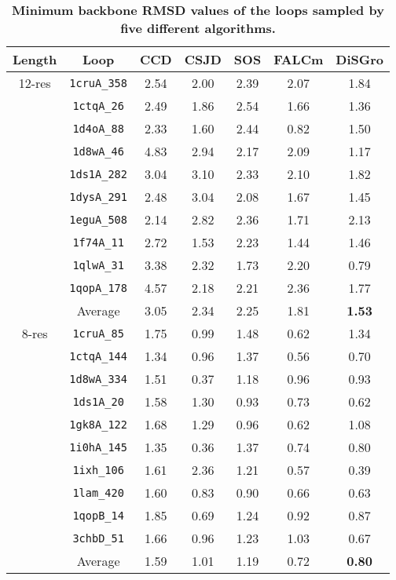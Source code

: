 \begin{table}[!h]
\caption{ \bf{Minimum backbone RMSD values of the loops sampled by
five different algorithms.}}
\begin{tabular}{|c|c||c|c|c|c||c|}
\hline
Length & Loop & CCD & CSJD & SOS & FALCm & {\sc DiSGro}\\
\hline
12-res & {\tt 1cruA\_358} & 2.54 & 2.00 & 2.39 & 2.07 & 1.84\\
     & {\tt 1ctqA\_26} & 2.49 & 1.86 & 2.54 & 1.66 & 1.36\\
     & {\tt 1d4oA\_88} & 2.33 & 1.60 & 2.44 & 0.82 & 1.50\\
     & {\tt 1d8wA\_46} & 4.83 & 2.94 & 2.17 & 2.09 & 1.17\\
     & {\tt 1ds1A\_282} & 3.04 & 3.10 & 2.33 & 2.10 & 1.82\\
     & {\tt 1dysA\_291} & 2.48 & 3.04 & 2.08 & 1.67 & 1.45\\
     & {\tt 1eguA\_508} & 2.14 & 2.82 & 2.36 & 1.71 & 2.13\\
     & {\tt 1f74A\_11} & 2.72 & 1.53 & 2.23 & 1.44 & 1.46\\
     & {\tt 1qlwA\_31} & 3.38 & 2.32 & 1.73 & 2.20 & 0.79\\
     & {\tt 1qopA\_178} & 4.57 & 2.18 & 2.21 & 2.36 & 1.77\\
     \hline
     & Average & 3.05 & 2.34 & 2.25 & 1.81 & \textbf{1.53}\\
     \hline
     \hline
    8-res & {\tt 1cruA\_85} & 1.75 & 0.99 & 1.48 & 0.62 & 1.34\\
     & {\tt 1ctqA\_144} & 1.34 & 0.96 & 1.37 & 0.56 & 0.70\\
     & {\tt 1d8wA\_334} & 1.51 & 0.37 & 1.18 & 0.96 & 0.93\\
     & {\tt 1ds1A\_20} & 1.58 & 1.30 & 0.93 & 0.73 & 0.62\\
     & {\tt 1gk8A\_122} & 1.68 & 1.29 & 0.96 & 0.62 & 1.08\\
     & {\tt 1i0hA\_145} & 1.35 & 0.36 & 1.37 & 0.74 & 0.80\\
     & {\tt 1ixh\_106} & 1.61 & 2.36 & 1.21 & 0.57 & 0.39\\
     & {\tt 1lam\_420} & 1.60 & 0.83 & 0.90 & 0.66 & 0.63\\
     & {\tt 1qopB\_14} & 1.85 & 0.69 & 1.24 & 0.92 & 0.87\\
     & {\tt 3chbD\_51} & 1.66 & 0.96 & 1.23 & 1.03 & 0.67\\
     \hline
     & Average & 1.59 & 1.01 & 1.19 & 0.72 & \textbf{0.80}\\

\end{tabular}
\end{table}
